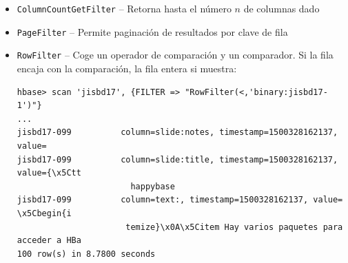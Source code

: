 \documentclass[14pt]{beamer}
\begin{document}
\begin{frame}
\begin{itemize}
\begin{frame}
\begin{itemize}
\item {\tt ColumnCountGetFilter} -- Retorna hasta el número $n$ de columnas
  dado

\item {\tt PageFilter} -- Permite paginación de resultados por clave de
  fila

  \framebreak

\item {\tt RowFilter} -- Coge un operador de comparación y un comparador.
  Si la fila encaja con la comparación, la fila entera si muestra:

\begin{lstlisting}
hbase> scan 'jisbd17', {FILTER => "RowFilter(<,'binary:jisbd17-1')"}
...
jisbd17-099          column=slide:notes, timestamp=1500328162137, value=
jisbd17-099          column=slide:title, timestamp=1500328162137, value={\x5Ctt
                       happybase
jisbd17-099          column=text:, timestamp=1500328162137, value=  \x5Cbegin{i
                      temize}\x0A\x5Citem Hay varios paquetes para acceder a HBa
100 row(s) in 8.7800 seconds
\end{lstlisting}









\end{itemize}
\end{frame}
\end{itemize}
\end{frame}
\end{document}
